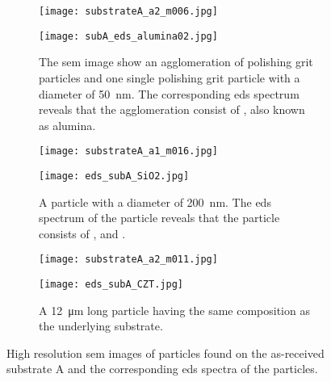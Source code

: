 \begin{figure}
    \centering
    \begin{subfigure}[t]{\textwidth}
          \begin{minipage}[t]{0.49\linewidth}
            \centering
            \texttt{[image: substrateA\_a2\_m006.jpg]}
          \end{minipage}
          \hspace{0.02\linewidth}
          \begin{minipage}[t]{0.49\linewidth}
            \centering
            \texttt{[image: subA\_eds\_alumina02.jpg]}
          \end{minipage}
        \caption{The \ac{sem} image show an agglomeration of polishing grit particles and one single polishing grit particle with a diameter of \SI{50}{\nano\metre}. The corresponding \ac{eds} spectrum reveals that the agglomeration consist of , also known as alumina.}\label{fig:subAa_polishing-grit}
    \end{subfigure}
    \par\bigskip
    \begin{subfigure}[t]{\textwidth}
          \begin{minipage}[t]{0.49\linewidth}
            \centering
            \texttt{[image: substrateA\_a1\_m016.jpg]}
          \end{minipage}
          \hspace{0.02\linewidth}
          \begin{minipage}[t]{0.49\linewidth}
            \centering
            \texttt{[image: eds\_subA\_SiO2.jpg]}
          \end{minipage}
        \caption{A particle with a diameter of \SI{200}{\nano\metre}. The \ac{eds} spectrum of the particle reveals that the particle consists of ,  and .}\label{fig:subAa_large-grit}
    \end{subfigure}
    \par\bigskip
    \begin{subfigure}[t]{\textwidth}
          \begin{minipage}[t]{0.49\linewidth}
            \centering
            \texttt{[image: substrateA\_a2\_m011.jpg]}
          \end{minipage}
          \hspace{0.02\linewidth}
          \begin{minipage}[t]{0.49\linewidth}
            \centering
            \texttt{[image: eds\_subA\_CZT.jpg]}
          \end{minipage}
        \caption{A \SI{12}{\micro\metre} long particle having the same composition as the underlying substrate.}\label{fig:subAa_czt-particle}
    \end{subfigure}
    \caption[\Ac{sem} images and \ac{eds} spectra of particles found on as-received substrate A.]{High resolution \acf{sem} images of particles found on the as-received substrate A and the corresponding \acf{eds} spectra of the particles.}\label{fig:subAa_sem_w_eds}
\end{figure}

